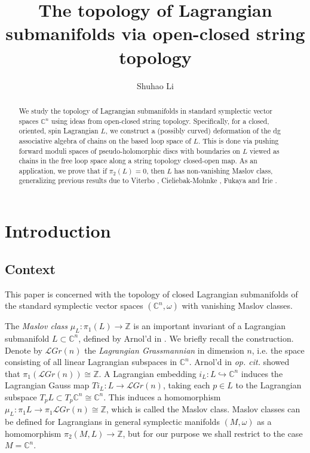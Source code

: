 \documentclass[10pt]{amsart}
\title{The topology of Lagrangian submanifolds via open-closed string topology}
\author{Shuhao Li}
\numberwithin{equation}{section}
\theoremstyle{plain}
\theoremstyle{definition}
\theoremstyle{remark}
\numberwithin{equation}{section}
\newcommand{\Z}{\mathbb{Z}}
\newcommand{\C}{\mathbb{C}}
\newcommand{\mc}[1]{\mathcal{#1}}
\begin{document}
	
	
	

\begin{abstract}
	We study the topology of Lagrangian submanifolds in standard symplectic vector spaces $\C^n$ using ideas from open-closed string topology. Specifically, for a closed, oriented, spin Lagrangian $L$, we construct a (possibly curved) deformation of the dg associative algebra of chains on the based loop space of $L$. This is done via pushing forward moduli spaces of pseudo-holomorphic discs with boundaries on $L$ viewed as chains in the free loop space along a string topology closed-open map. As an application, we prove that if $\pi_2(L)=0$, then $L$ has non-vanishing Maslov class, generalizing previous results due to Viterbo \cite{ViterboTori}, Cieliebak-Mohnke \cite{CieliebakMohnke}, Fukaya \cite{FukayaLagrangian} and Irie \cite{Irie2}.
\end{abstract}

	\maketitle


{\hypersetup{linkcolor=black}
\tableofcontents}



\section{Introduction}

\subsection{Context}\label{Subsc: Context}
This paper is concerned with the topology of closed Lagrangian submanifolds of the standard symplectic vector spaces $(\C^n,\omega)$ with vanishing Maslov classes.

The \emph{Maslov class} $\mu_L\colon \pi_1(L)\to \Z$ is an important invariant of a Lagrangian submanifold $L\subset \C^n$, defined by Arnol'd in \cite{ArnoldMaslov}.
We briefly recall the construction.
Denote by $\mathcal{L}Gr(n)$ the \emph{Lagrangian Grassmannian} in dimension $n$, i.e. the space consisting of all linear Lagrangian subspaces in $\C^n$.
Arnol'd in \emph{op. cit.} showed that $\pi_1(\mathcal{L}Gr(n))\cong \Z$.
A Lagrangian embedding $i_L\colon L\hookrightarrow \C^n$ induces the Lagrangian Gauss map $Ti_L\colon L\to \mathcal{L}Gr(n)$, taking each $p\in L$ to the Lagrangian subspace $T_pL\subset T_p\C^n\cong \C^n$.
This induces a homomorphism $\mu_L\colon \pi_1L\to \pi_1\mc{L}Gr(n)\cong \Z$, which is called the Maslov class.
Maslov classes can be defined for Lagrangians in general symplectic manifolds $(M,\omega)$ as a homomorphism $\pi_2(M,L)\to \Z$, but for our purpose we shall restrict to the case $M=\C^n$.
\end{document}
